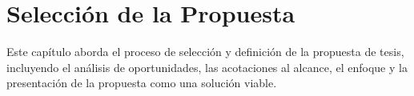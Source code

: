 \chapter{Selección de la Propuesta}

Este capítulo aborda el proceso de selección y definición de la propuesta de tesis, incluyendo el análisis de oportunidades, las acotaciones al alcance, el enfoque y la presentación de la propuesta como una solución viable.




